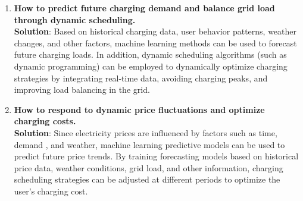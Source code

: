 \documentclass[
	english,
	ruledheaders=section,%
	class=report,%
	thesis={type=Report},%
	accentcolor=9c,%
	custommargins=true,%
	marginpar=false,%
	parskip=half-,%
	fontsize=11pt,%
	logofile={img/tuda_logo.pdf}, %
]{tudapub}
\begin{document}
\begin{enumerate}

    \item \textbf{How to predict future charging demand and balance grid load through dynamic scheduling.} \\
    \textbf{Solution}: Based on historical charging data, user behavior patterns, weather changes, and other factors, machine learning methods can be used to forecast future charging loads. In addition, dynamic scheduling algorithms (such as dynamic programming) can be employed to dynamically optimize charging strategies by integrating real-time data, avoiding charging peaks, and improving load balancing in the grid.

    

    \item \textbf{How to respond to dynamic price fluctuations and optimize charging costs.} \\
    \textbf{Solution}: Since electricity prices are influenced by factors such as time, demand , and weather, machine learning predictive models can be used to predict future price trends. By training forecasting models based on historical price data, weather conditions, grid load, and other information, charging scheduling strategies can be adjusted at different periods to optimize the user's charging cost.

    


\end{enumerate}
\end{document}
